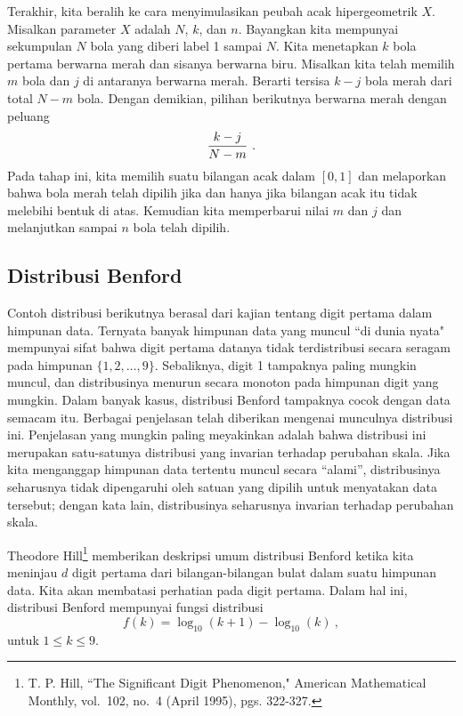 \par
Terakhir, kita beralih ke cara menyimulasikan peubah acak hipergeometrik $X$.
Misalkan parameter $X$ adalah $N$, $k$, dan $n$. Bayangkan kita mempunyai sekumpulan
$N$ bola yang diberi label 1 sampai $N$. Kita menetapkan $k$ bola pertama berwarna
merah dan sisanya berwarna biru. Misalkan kita telah memilih $m$ bola dan $j$ di
antaranya berwarna merah. Berarti tersisa $k-j$ bola merah dari total $N-m$ bola.
Dengan demikian, pilihan berikutnya berwarna merah dengan peluang
$${{k-j}\over{N-m}}\ .$$ Pada tahap ini, kita memilih suatu bilangan acak dalam
$[0, 1]$ dan melaporkan bahwa bola merah telah dipilih jika dan hanya jika bilangan
acak itu tidak melebihi bentuk di atas. Kemudian kita memperbarui nilai $m$ dan $j$
dan melanjutkan sampai $n$ bola telah dipilih.

\subsection*{Distribusi Benford}
Contoh distribusi berikutnya berasal dari kajian tentang digit pertama dalam himpunan data.
Ternyata banyak himpunan data yang muncul ``di dunia nyata" mempunyai sifat bahwa digit
pertama datanya tidak terdistribusi secara seragam pada himpunan $\{1, 2, \ldots, 9\}$.
Sebaliknya, digit 1 tampaknya paling mungkin muncul, dan distribusinya menurun secara
monoton pada himpunan digit yang mungkin. Dalam banyak kasus, distribusi Benford tampaknya
cocok dengan data semacam itu. Berbagai penjelasan telah diberikan mengenai munculnya
distribusi ini. Penjelasan yang mungkin paling meyakinkan adalah bahwa distribusi ini
merupakan satu-satunya distribusi yang invarian terhadap perubahan skala. Jika kita
menganggap himpunan data tertentu muncul secara ``alami'', distribusinya seharusnya tidak
dipengaruhi oleh satuan yang dipilih untuk menyatakan data tersebut; dengan kata lain,
distribusinya seharusnya invarian terhadap perubahan skala.
\par
Theodore Hill\footnote{T. P. Hill, ``The Significant Digit Phenomenon," \emx
{American Mathematical Monthly,} vol.\ 102, no.\ 4 (April 1995), pgs. 322-327.} memberikan
deskripsi umum distribusi Benford ketika kita meninjau $d$ digit pertama dari
bilangan-bilangan bulat dalam suatu himpunan data. Kita akan membatasi perhatian pada
digit pertama. Dalam hal ini, distribusi Benford mempunyai fungsi distribusi
$$f(k) = \log_{10}(k+1) - \log_{10}(k)\ ,$$
untuk $1 \le k \le 9$.
\par
